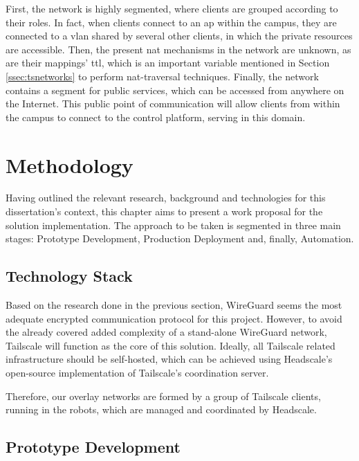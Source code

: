 \documentclass[11pt,twoside,a4paper]{report}
\begin{document}
First, the network is highly segmented, where clients are grouped according to their roles. In fact, when clients connect to an \ac{ap} within the campus, they are connected to a \ac{vlan} shared by several other clients, in which the private resources are accessible. Then, the present \ac{nat} mechanisms in the network are unknown, as are their mappings' \ac{ttl}, which is an important variable mentioned in Section \ref{ssec:tsnetworks} to perform \ac{nat}-traversal techniques. Finally, the network contains a segment for public services, which can be accessed from anywhere on the Internet. This public point of communication will allow clients from within the campus to connect to the control platform, serving in this domain.

\chapter{Methodology}
\label{chapter:method}

Having outlined the relevant research, background and technologies for this dissertation's context, this chapter aims to present a work proposal for the solution implementation. The approach to be taken is segmented in three main stages: Prototype Development, Production Deployment and, finally, Automation.

\section{Technology Stack}

Based on the research done in the previous section, WireGuard seems the most adequate encrypted communication protocol for this project. However, to avoid the already covered added complexity of a stand-alone WireGuard network, Tailscale will function as the core of this solution. Ideally, all Tailscale related infrastructure should be self-hosted, which can be achieved using Headscale's open-source implementation of Tailscale's coordination server.

Therefore, our overlay networks are formed by a group of Tailscale clients, running in the robots, which are managed and coordinated by Headscale.

\section{Prototype Development}
\label{sec:protodev}
\end{document}
